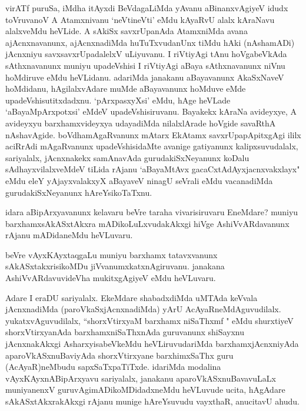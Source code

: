 \begin{artha}
virATf puruSa, iMdha itAyxdi BeVdagaLiMda yAvanu aBinanxvAgiyeV idudx toVruvanoV A Atamxnivanu `neVtineVti' eMdu kAyaRvU alalx kAraNavu alalxveMdu heVLide. A sAkiSx savxrUpanAda AtamxniMda avana ajAcnxnavanunx, ajAcnxnadiMda huTuTxvudanUnx tiMdu hAki (nAshamADi) jAcnxniyu savxsavxrUpadalelxV uLiyuvanu. I riVtiyAgi tAnu hoVgabeVkAda sAthxnavanunx muniyu upadeVshisi I riVtiyAgi aBaya sAthxnavanunx niVnu hoMdiruve eMdu heVLidanu. adariMda janakanu aBayavanunx AkaSxNaveV hoMdidanu, hAgilalxvAdare muMde aBayavanunx hoMduve eMde upadeVshisutitxdadxnu. `pArxpasxyXsi' eMdu, hAge heVLade `aBayaMpArxpotx\s si' eMdeV upadeVshisiruvanu. Bayakekx kAraNa avideyxye, A avideyxyu barxhamxvideyxya udayadiMda nilalxlArade hoVgide savaRthA nAshavAgide. boVdhamAgaRvanunx mAtarx EkAtamx savxrUpapApitxgAgi ililx aciRrAdi mAgaRvanunx upadeVshisidaMte avanige gatiyanunx kalipxsuvudalalx, sariyalalx, jAcnxnakekx samAnavAda gurudakiSxNeyanunx koDalu sAdhayxvilalxveMdeV tiLida rAjanu `aBayaMtAvx gacaCxtAdAyxjacnxvakxlayx" eMdu eleY yAjayxvalakxyX aBayaveV ninagU seVrali eMdu vacanadiMda gurudakiSxNeyanunx hAreYsikoTaTxnu.
\end{artha}


\begin{artha}
idara aBipArxyavanunx kelavaru beVre taraha vivarisiruvaru EneMdare? muniyu barxhamxsAkASxtAkxra mADikoLuLxvudakAkxgi hiVge AshiVvARdavanunx rAjanu mADidaneMdu heVLuvaru.
\end{artha}

\begin{artha}
beVre vAyxKAyxtaqgaLu muniyu barxhamx tatavxvanunx sAkASxtakxrisikoMDu jiVvanumxkatxnAgiruvanu. janakana AshiVvARdavuvideVha mukitxgAgiyeV eMdu heVLuvaru.
\end{artha}

\begin{artha}
Adare I eraDU sariyalalx. EkeMdare shabadxdiMda uMTAda keVvala jAcnxnadiMda (paroVkaSxjAcnxnadiMda) yArU AcAyaRneMdAguvudilalx. yukatxvAguvudilalx, ``shorxVtirxyaM barxhamx niSaThxmf " eMdu shurxtiyeV shorxVtirxyanAda barxhamxniSaThxnAda guruvanunx shiSayxnu jAcnxnakAkxgi AsharxyisabeVkeMdu heVLiruvudariMda barxhamxjAcnxniyAda aparoVkASxnuBaviyAda shorxVtirxyane barxhimxSaThx guru (AcAyaR)neMbudu sapxSaTxpaTiTxde. idariMda modalina vAyxKAyxnABipArxyavu sariyalalx, janakanu aparoVkASxnuBavavuLaLx muniyanenxV guruvAgimADikoMDidadxneMdu heVLuvude ucita, hAgAdare sAkASxtAkxrakAkxgi rAjanu munige hAreYsuvudu vayxthaR, anucitavU ahudu. 
\end{artha}

